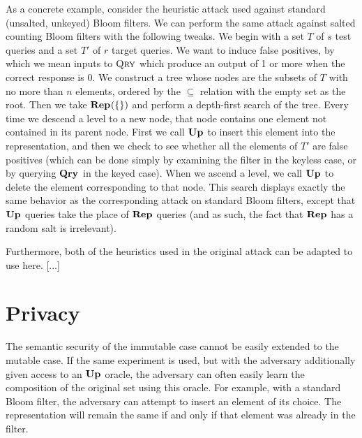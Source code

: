 \documentclass[11pt, pdftex]{article}
\newcommand{\REPO}{\oraclefont{Rep}}
\newcommand{\UPO}{\oraclefont{Up}}
\newcommand{\QRYO}{\oraclefont{Qry}}
\begin{document}
As a concrete example, consider the heuristic attack used against standard (unsalted, unkeyed) Bloom filters. We can perform the same attack against salted counting Bloom filters with the following tweaks. We begin with a set $T$ of $s$ test queries and a set $T'$ of $r$ target queries. We want to induce false positives, by which we mean inputs to $\textsc{Qry}$ which produce an output of 1 or more when the correct response is 0. We construct a tree whose nodes are the subsets of $T$ with no more than $n$ elements, ordered by the $\subseteq$ relation with the empty set as the root. Then we take $\REPO(\{\})$ and perform a depth-first search of the tree. Every time we descend a level to a new node, that node contains one element not contained in its parent node. First we call $\UPO$ to insert this element into the representation, and then we check to see whether all the elements of $T'$ are false positives (which can be done simply by examining the filter in the keyless case, or by querying $\QRYO$ in the keyed case). When we ascend a level, we call $\UPO$ to delete the element corresponding to that node. This search displays exactly the same behavior as the corresponding attack on standard Bloom filters, except that $\UPO$ queries take the place of $\REPO$ queries (and as such, the fact that $\REPO$ has a random salt is irrelevant).

Furthermore, both of the heuristics used in the original attack can be adapted to use here. [...]

\section{Privacy}

The semantic security of the immutable case cannot be easily extended to the mutable case. If the same experiment is used, but with the adversary additionally given access to an $\UPO$ oracle, the adversary can often easily learn the composition of the original set using this oracle. For example, with a standard Bloom filter, the adversary can attempt to insert an element of its choice. The representation will remain the same if and only if that element was already in the filter.
\end{document}
